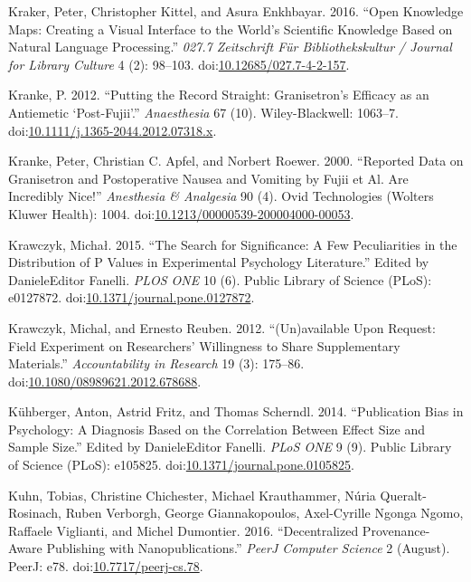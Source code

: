 \documentclass[a5paper]{book}
\begin{document}
\hypertarget{ref-doi:10.12685ux2f027.7-4-2-157}{}
Kraker, Peter, Christopher Kittel, and Asura Enkhbayar. 2016. ``Open
Knowledge Maps: Creating a Visual Interface to the World's Scientific
Knowledge Based on Natural Language Processing.'' \emph{027.7
Zeitschrift Für Bibliothekskultur / Journal for Library Culture} 4 (2):
98--103.
doi:\href{https://doi.org/10.12685/027.7-4-2-157}{10.12685/027.7-4-2-157}.

\hypertarget{ref-doi:10.1111ux2fj.1365-2044.2012.07318.x}{}
Kranke, P. 2012. ``Putting the Record Straight: Granisetron's Efficacy
as an Antiemetic `Post-Fujii'.'' \emph{Anaesthesia} 67 (10).
Wiley-Blackwell: 1063--7.
doi:\href{https://doi.org/10.1111/j.1365-2044.2012.07318.x}{10.1111/j.1365-2044.2012.07318.x}.

\hypertarget{ref-doi:10.1213ux2f00000539-200004000-00053}{}
Kranke, Peter, Christian C. Apfel, and Norbert Roewer. 2000. ``Reported
Data on Granisetron and Postoperative Nausea and Vomiting by Fujii et
Al. Are Incredibly Nice!'' \emph{Anesthesia \& Analgesia} 90 (4). Ovid
Technologies (Wolters Kluwer Health): 1004.
doi:\href{https://doi.org/10.1213/00000539-200004000-00053}{10.1213/00000539-200004000-00053}.

\hypertarget{ref-doi:10.1371ux2fjournal.pone.0127872}{}
Krawczyk, Michał. 2015. ``The Search for Significance: A Few
Peculiarities in the Distribution of P Values in Experimental Psychology
Literature.'' Edited by DanieleEditor Fanelli. \emph{PLOS ONE} 10 (6).
Public Library of Science (PLoS): e0127872.
doi:\href{https://doi.org/10.1371/journal.pone.0127872}{10.1371/journal.pone.0127872}.

\hypertarget{ref-doi:10.1080ux2f08989621.2012.678688}{}
Krawczyk, Michal, and Ernesto Reuben. 2012. ``(Un)available Upon
Request: Field Experiment on Researchers' Willingness to Share
Supplementary Materials.'' \emph{Accountability in Research} 19 (3):
175--86.
doi:\href{https://doi.org/10.1080/08989621.2012.678688}{10.1080/08989621.2012.678688}.

\hypertarget{ref-doi:10.1371ux2fjournal.pone.0105825}{}
Kühberger, Anton, Astrid Fritz, and Thomas Scherndl. 2014. ``Publication
Bias in Psychology: A Diagnosis Based on the Correlation Between Effect
Size and Sample Size.'' Edited by DanieleEditor Fanelli. \emph{PLoS ONE}
9 (9). Public Library of Science (PLoS): e105825.
doi:\href{https://doi.org/10.1371/journal.pone.0105825}{10.1371/journal.pone.0105825}.

\hypertarget{ref-doi:10.7717ux2fpeerj-cs.78}{}
Kuhn, Tobias, Christine Chichester, Michael Krauthammer, Núria
Queralt-Rosinach, Ruben Verborgh, George Giannakopoulos, Axel-Cyrille
Ngonga Ngomo, Raffaele Viglianti, and Michel Dumontier. 2016.
``Decentralized Provenance-Aware Publishing with Nanopublications.''
\emph{PeerJ Computer Science} 2 (August). PeerJ: e78.
doi:\href{https://doi.org/10.7717/peerj-cs.78}{10.7717/peerj-cs.78}.
\end{document}
